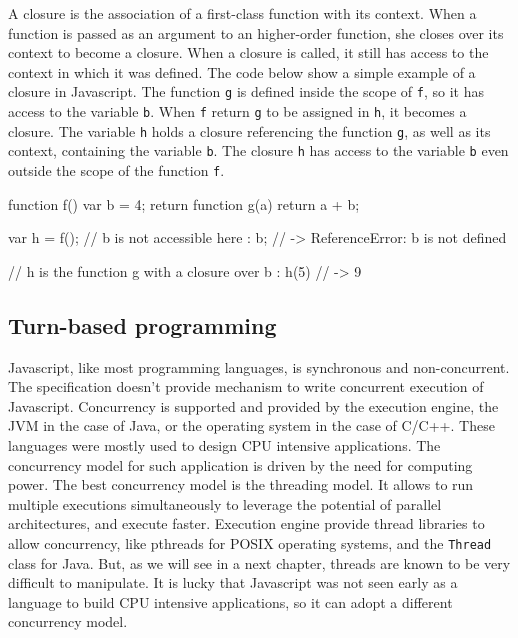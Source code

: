 A closure is the association of a first-class function with its context.
When a function is passed as an argument to an higher-order function, she closes over its context to become a closure.
When a closure is called, it still has access to the context in which it was defined.
The code below show a simple example of a closure in Javascript.
The function \texttt{g} is defined inside the scope of \texttt{f}, so it has access to the variable \texttt{b}.
When \texttt{f} return \texttt{g} to be assigned in \texttt{h}, it becomes a closure.
The variable \texttt{h} holds a closure referencing the function \texttt{g}, as well as its context, containing the variable \texttt{b}.
The closure \texttt{h} has access to the variable \texttt{b} even outside the scope of the function \texttt{f}.

\begin{code}
  function f() {
    var b = 4;
    return function g(a) {
      return a + b;
    }
  }

  var h = f();
  // b is not accessible here :
  b; // -> ReferenceError: b is not defined

  // h is the function g with a closure over b :
  h(5) // -> 9
\end{code}






\subsection{Turn-based programming}

Javascript, like most programming languages, is synchronous and non-concurrent. The specification doesn't provide mechanism to write concurrent execution of Javascript.
Concurrency is supported and provided by the execution engine, the JVM in the case of Java, or the operating system in the case of C/C++.
These languages were mostly used to design CPU intensive applications.
The concurrency model for such application is driven by the need for computing power.
The best concurrency model is the threading model.
It allows to run multiple executions simultaneously to leverage the potential of parallel architectures, and execute faster.
Execution engine provide thread libraries to allow concurrency, like pthreads for POSIX operating systems, and the \texttt{Thread} class for Java.
But, as we will see in a next chapter, threads are known to be very difficult to manipulate.
It is lucky that Javascript was not seen early as a language to build CPU intensive applications, so it can adopt a different concurrency model.

